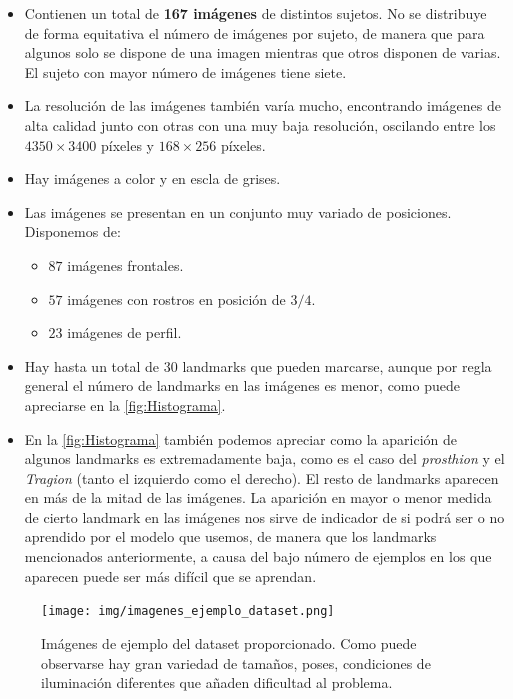         \begin{itemize}
            \item Contienen un total de \textbf{167 imágenes} de distintos sujetos. No se distribuye de forma equitativa el número de imágenes por sujeto, de manera que para algunos solo se dispone de una imagen mientras que otros disponen de varias. El sujeto con mayor número de imágenes tiene siete.
            \item La resolución de las imágenes también varía mucho, encontrando imágenes de alta calidad junto con otras con una muy baja resolución, oscilando entre los $4350 \times 3400$ píxeles y $168 \times 256$ píxeles.
            \item Hay imágenes a color y en escla de grises.
            \item Las imágenes se presentan en un conjunto muy variado de posiciones. Disponemos de: 
            \begin{itemize}
                \item $87$ imágenes frontales.
                \item $57$ imágenes con rostros en posición de \textbf{$3/4$}.
                \item $23$ imágenes de perfil.
            \end{itemize}
            \item Hay hasta un total de $30$ landmarks que pueden marcarse, aunque por regla general el número de landmarks en las imágenes es menor, como puede apreciarse en la \autoref{fig:Histograma}.
            \item En la \autoref{fig:Histograma} también podemos apreciar como la aparición de algunos landmarks es extremadamente baja, como es el caso del \textit{prosthion} y el \textit{Tragion} (tanto el izquierdo como el derecho). El resto de landmarks aparecen en más de la mitad de las imágenes. 
            \medskip
            \noindent La aparición en mayor o menor medida de cierto landmark en las imágenes nos sirve de indicador de si podrá ser o no aprendido por el modelo que usemos, de manera que los landmarks mencionados anteriormente, a causa del bajo número de ejemplos en los que aparecen puede ser más difícil que se aprendan.
        \end{itemize}

            \begin{figure}[!h]
                \centering
                \texttt{[image: img/imagenes\_ejemplo\_dataset.png]}
                \caption{Imágenes de ejemplo del dataset proporcionado. Como puede observarse hay gran variedad de tamaños, poses, condiciones de iluminación diferentes que añaden dificultad al problema.}
                \label{fig:Imagenes_dataset}
            \end{figure}


